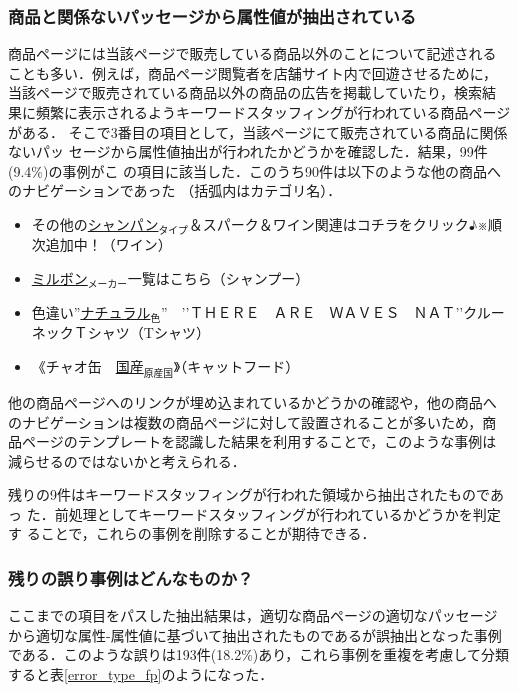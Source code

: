 \documentclass[japanese]{jnlp_1.4}
\begin{document}
\subsubsection{商品と関係ないパッセージから属性値が抽出されている}
\label{check3}

商品ページには当該ページで販売している商品以外のことについて記述される
ことも多い．例えば，商品ページ閲覧者を店舗サイト内で回遊させるために，
当該ページで販売されている商品以外の商品の広告を掲載していたり，検索結
果に頻繁に表示されるようキーワードスタッフィングが行われている商品ページがある．
そこで3番目の項目として，当該ページにて販売されている商品に関係ないパッ
セージから属性値抽出が行われたかどうかを確認した．結果，99件(9.4\%)の事例がこ
の項目に該当した．このうち90件は以下のような他の商品へのナビゲーションであった
（括弧内はカテゴリ名）．

\begin{itemize}
\item その他の\underline{シャンパン}$_{タイプ}$＆スパーク＆ワイン関連はコチラをクリック♪※順次追加中！（ワイン）
\item \underline{ミルボン}$_{メーカー}$一覧はこちら（シャンプー）
\item 色違い”\underline{ナチュラル}$_{色}$”　’’ＴＨＥＲＥ　ＡＲＥ　ＷＡＶＥＳ　ＮＡＴ’’クルーネックＴシャツ（Tシャツ）
\item 《チャオ缶　\underline{国産}$_{原産国}$》（キャットフード）
\end{itemize}

\noindent
他の商品ページへのリンクが埋め込まれているかどうかの確認や，他の商品へ
のナビゲーションは複数の商品ページに対して設置されることが多いため，商
品ページのテンプレートを認識した結果を利用することで，このような事例は
減らせるのではないかと考えられる．

残りの9件はキーワードスタッフィングが行われた領域から抽出されたものであっ
た．前処理としてキーワードスタッフィングが行われているかどうかを判定す
ることで，これらの事例を削除することが期待できる．

\vspace{0.5\Cvs}
\subsubsection{残りの誤り事例はどんなものか？}
\label{check4}

ここまでの項目をパスした抽出結果は，適切な商品ページの適切なパッセージ
から適切な属性-属性値に基づいて抽出されたものであるが誤抽出となった事例
である．このような誤りは193件(18.2\%)あり，これら事例を重複を考慮して分類すると表\ref{error_type_fp}のようになった．
\end{document}
